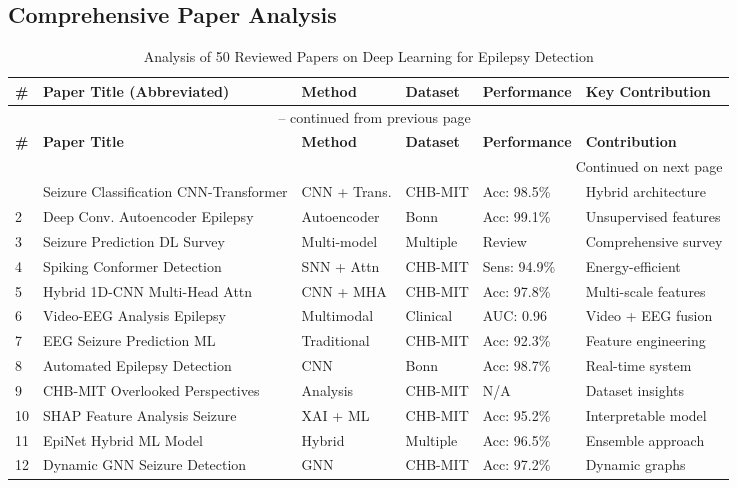 \documentclass[12pt,a4paper]{article}
\begin{document}
\subsection{Comprehensive Paper Analysis}

\begin{longtable}{p{0.5cm}p{4cm}p{2.5cm}p{1.5cm}p{2cm}p{2cm}}
\caption{Analysis of 50 Reviewed Papers on Deep Learning for Epilepsy Detection} \label{tab:papers} \\
\toprule
\textbf{\#} & \textbf{Paper Title (Abbreviated)} & \textbf{Method} & \textbf{Dataset} & \textbf{Performance} & \textbf{Key Contribution} \\
\midrule
\endfirsthead
\multicolumn{6}{c}{\tablename\ \thetable{} -- continued from previous page} \\
\toprule
\textbf{\#} & \textbf{Paper Title} & \textbf{Method} & \textbf{Dataset} & \textbf{Performance} & \textbf{Contribution} \\
\midrule
\endhead
\midrule
\multicolumn{6}{r}{Continued on next page} \\
\endfoot
\bottomrule
\endlastfoot
1 & Seizure Classification CNN-Transformer & CNN + Trans. & CHB-MIT & Acc: 98.5\% & Hybrid architecture \\
2 & Deep Conv. Autoencoder Epilepsy & Autoencoder & Bonn & Acc: 99.1\% & Unsupervised features \\
3 & Seizure Prediction DL Survey & Multi-model & Multiple & Review & Comprehensive survey \\
4 & Spiking Conformer Detection & SNN + Attn & CHB-MIT & Sens: 94.9\% & Energy-efficient \\
5 & Hybrid 1D-CNN Multi-Head Attn & CNN + MHA & CHB-MIT & Acc: 97.8\% & Multi-scale features \\
6 & Video-EEG Analysis Epilepsy & Multimodal & Clinical & AUC: 0.96 & Video + EEG fusion \\
7 & EEG Seizure Prediction ML & Traditional & CHB-MIT & Acc: 92.3\% & Feature engineering \\
8 & Automated Epilepsy Detection & CNN & Bonn & Acc: 98.7\% & Real-time system \\
9 & CHB-MIT Overlooked Perspectives & Analysis & CHB-MIT & N/A & Dataset insights \\
10 & SHAP Feature Analysis Seizure & XAI + ML & CHB-MIT & Acc: 95.2\% & Interpretable model \\
11 & EpiNet Hybrid ML Model & Hybrid & Multiple & Acc: 96.5\% & Ensemble approach \\
12 & Dynamic GNN Seizure Detection & GNN & CHB-MIT & Acc: 97.2\% & Dynamic graphs \\

\end{longtable}
\end{document}
